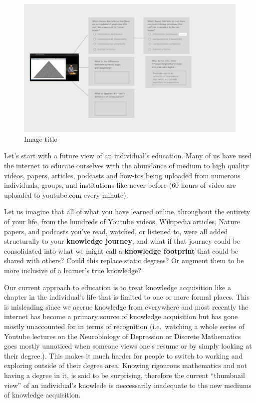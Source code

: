 \documentclass[]{book}
\theoremstyle{definition}
\theoremstyle{definition}
\theoremstyle{definition}
\theoremstyle{remark}
\begin{document}
\begin{figure}
\centering
\includegraphics{img/MtoQA.png}
\caption{Image title}
\end{figure}

Let's start with a future view of an individual's education. Many of us
have used the internet to educate ourselves with the abundance of medium
to high quality videos, papers, articles, podcasts and how-tos being
uploaded from numerous individuals, groups, and institutions like never
before (60 hours of video are uploaded to youtube.com every minute).

Let us imagine that all of what you have learned online, throughout the
entirety of your life, from the hundreds of Youtube videos, Wikipedia
articles, Nature papers, and podcasts you've read, watched, or listened
to, were all added structurally to your \textbf{knowledge journey}, and
what if that journey could be consolidated into what we might call a
\textbf{knowledge footprint} that could be shared with others? Could
this replace static degrees? Or augment them to be more inclusive of a
learner's true knowledge?

Our current approach to education is to treat knowledge acquisition like
a chapter in the individual's life that is limited to one or more formal
places. This is misleading since we accrue knowledge from everywhere and
most recently the internet has become a primary source of knowledge
acquisition but has gone mostly unaccounted for in terms of recognition
(i.e.~watching a whole series of Youtube lectures on the Neurobiology of
Depression or Discrete Mathematics goes mostly unnoticed when someone
views one's resume or by simply looking at their degree.). This makes it
much harder for people to switch to working and exploring outside of
their degree area. Knowing rigourous mathematics and not having a degree
in it, is said to be surprising, therefore the current ``thumbnail
view'' of an individual's knowlede is neccessarily inadequate to the new
mediums of knowledge acquisition.
\end{document}
